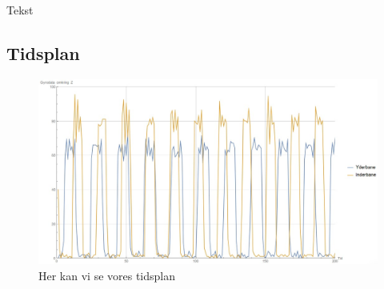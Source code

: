 Tekst


\subsection{Tidsplan}

\begin{figure}[h]
	\centering
		\includegraphics[scale=0.75]{Billeder/Gyro.jpg}
	\caption{Her kan vi se vores tidsplan}
	\label{fig:tidsplan}
\end{figure}